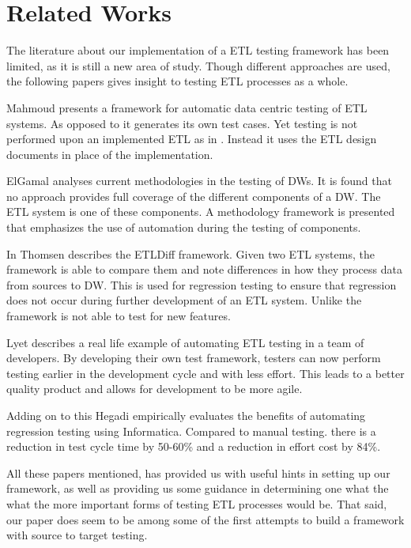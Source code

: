 \section{Related Works}
The literature about our implementation of a ETL testing framework has been limited, as it is still a new area of study. Though different approaches are used, the following papers gives insight to testing ETL processes as a whole.

Mahmoud \cite{dakroryautomated} presents a framework for automatic data centric testing of ETL systems. As opposed to \FW{} it generates its own test cases. Yet testing is not performed upon an implemented ETL as in \FW{}. Instead it uses the ETL design documents in place of the implementation.

ElGamal \cite{elgamal2012towards} analyses current methodologies in the testing of DWs. It is found that no approach provides full coverage of the different components of a DW. The ETL system is one of these components. A methodology framework is presented that emphasizes the use of automation during the testing of components.

In \cite{thomsen2006etldiff} Thomsen describes the ETLDiff framework. Given two ETL systems, the framework is able to compare them and note differences in how they process data from sources to DW. This is used for regression testing to ensure that regression does not occur during further development of an ETL system. Unlike \FW the framework is not able to test for new features.  

Lyet \cite{subuiyer2014} describes a real life example of automating ETL testing in a team of developers. By developing their own test framework, testers can now perform testing earlier in the development cycle and with less effort. This leads to a better quality product and allows for development to be more agile. 

Adding on to this Hegadi \cite{manjunath2012case} empirically evaluates the benefits of automating regression testing using  Informatica. Compared to manual testing. there is a reduction in test cycle time by 50-60\% and a reduction in effort cost by 84\%. 

All these papers mentioned, has provided us with useful hints in setting up our framework, as well as providing us some guidance in determining one what the what the more important forms of testing ETL processes would be. That said, our paper does seem to be among some of the first attempts to build a framework with source to target testing.



